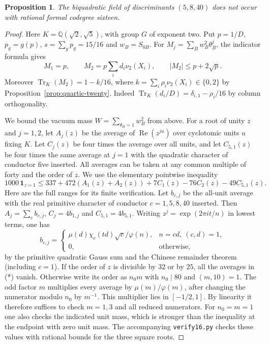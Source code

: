 \documentclass[11pt,a4paper]{article}
\newtheorem{proposition}[theorem]{Proposition}
\numberwithin{equation}{section}
\begin{document}
\begin{proposition}\label{prop:quartic-sixteen}
The biquadratic field of discriminants $(5,8,40)$ does not occur with rational formal codegree sixteen.
\end{proposition}
\begin{proof}
Here $K=\mathbb Q(\sqrt2,\sqrt5)$, with group $G$ of exponent two.
Put $p=1/D$, $p_g=g(p)$, $s=\sum_g p_g=15/16$ and $w_B=S_{0B}$.
For $M_j=\sum_B w_B^2\theta_B^j$, the indicator formula gives
\[
 M_1=p,\qquad M_2=p\sum_i d_i\nu_2(X_i),\qquad
 |M_2|\le p+2\sqrt p.
\]
Moreover $\operatorname{Tr}_K(M_2)=1-k/16$, where
$k=\sum_i\rho_i\nu_2(X_i)\in\{0,2\}$ by Proposition~\ref{prop:quartic-twenty}.
Indeed $\operatorname{Tr}_K(d_i/D)=\delta_{i,1}-\rho_i/16$ by column orthogonality.

We bound the vacuum mass $W=\sum_{\theta_B=1}w_B^2$ from above.
For a root of unity $z$ and $j=1,2$, let $A_j(z)$ be the average of
$\operatorname{Re}(z^{ju})$ over cyclotomic units $u$ fixing $K$.
Let $C_j(z)$ be four times the average over all units, and
let $C_{5,1}(z)$ be four times the same average at $j=1$ with the
quadratic character of conductor five inserted. All averages can be
taken at any common multiple of forty and the order of $z$. We use
the elementary pointwise inequality
\[
 1000\,\mathbf1_{z=1}\le
 337+472(A_1(z)+A_2(z))+7 C_1(z)-76 C_2(z)-49 C_{5,1}(z).
 \tag{*}
\]
Here are the full ranges for its finite verification.
Let $b_{c,j}$ be the all-unit average with the real primitive character
of conductor $c=1,5,8,40$ inserted. Then $A_j=\sum_c b_{c,j}$,
$C_j=4b_{1,j}$ and $C_{5,1}=4b_{5,1}$.
Writing $z^j=\exp(2\pi i t/n)$ in lowest terms, one has
\[
 b_{c,j}=
 \begin{cases}
 \mu(d)\chi_c(td)\sqrt c/\varphi(n),&
 n=cd,\ (c,d)=1,\\
 0,&\text{otherwise},
 \end{cases}
\]
by the primitive quadratic Gauss sum and the Chinese remainder
theorem (including $c=1$). If the order of $z$ is divisible by
$32$ or by $25$, all the averages in (*) vanish. Otherwise write
its order as $n_0 m$ with $n_0\mid80$ and $(m,10)=1$.
The odd factor $m$ multiplies every average by
$\mu(m)/\varphi(m)$, after changing the numerator modulo $n_0$
by $m^{-1}$. This multiplier lies in $[-1/2,1]$. By linearity it
therefore suffices to check $m=1,3$ and all reduced numerators.
For $n_0=m=1$ one also checks the indicated unit mass, which is
stronger than the inequality at the endpoint with zero unit mass.
The accompanying \texttt{verify16.py} checks these values with rational
bounds for the three square roots.


\end{proof}
\end{document}
